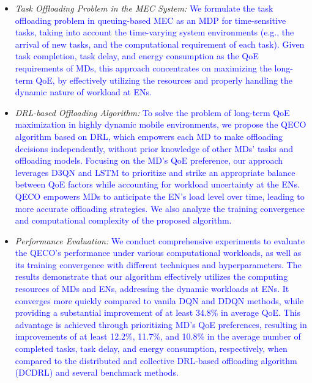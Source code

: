 \documentclass[12pt,draftclsnofoot,onecolumn]{IEEEtran}
\begin{document}
\begin{itemize}
	\item \textit{Task Offloading Problem in the MEC System:} \textcolor{blue}{ We formulate the task offloading problem in queuing-based MEC as an MDP for time-sensitive tasks, taking into account the time-varying system environments (e.g., the arrival of new tasks, and the computational requirement of each task). Given task completion, task delay, and energy consumption as the QoE requirements of MDs, this approach concentrates on maximizing the long-term QoE, by effectively utilizing the resources and properly handling the dynamic nature of workload at ENs.}
	
	
	
	\item \textit{DRL-based Offloading Algorithm:} \textcolor{blue}{To solve the problem of long-term QoE maximization in highly dynamic mobile environments, we propose the QECO algorithm based on DRL, which empowers each MD to make offloading decisions independently, without prior knowledge of other MDs' tasks and offloading models. Focusing on the MD's QoE preference, our approach leverages D3QN and LSTM to prioritize and strike an appropriate balance between QoE factors while accounting for workload uncertainty at the ENs. QECO empowers MDs to anticipate the EN's load level over time, leading to more accurate offloading strategies. We also analyze the training convergence and computational complexity of the proposed algorithm.}
	
	\item \textit{Performance Evaluation:} \textcolor{blue}{We conduct comprehensive experiments to evaluate the QECO's performance under various computational workloads, as well as its training convergence with different techniques and hyperparameters. The results demonstrate that our algorithm effectively utilizes the computing resources of MDs and ENs, addressing the dynamic workloads at ENs. It converges more quickly compared to vanila DQN and DDQN methods, while providing a substantial improvement of at least 34.8\% in average QoE. This advantage is achieved through prioritizing MD's QoE preferences, resulting in improvements of at least 12.2\%, 11.7\%, and 10.8\% in the average number of completed tasks, task delay, and energy consumption, respectively, when compared to the distributed and collective DRL-based offloading algorithm (DCDRL) \cite{qiu2020distributed} and several benchmark methods.}
	
	
	
\end{itemize}
\end{document}
